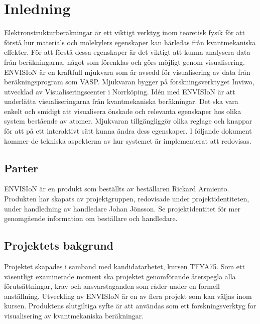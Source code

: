 \section{Inledning}
Elektronstrukturberäkningar är ett viktigt verktyg inom teoretisk fysik för att förstå hur materials och molekylers egenskaper kan härledas från kvantmekaniska effekter. För att förstå dessa egenskaper är det viktigt att kunna analysera data från beräkningarna, något som förenklas och görs möjligt genom visualisering. ENVISIoN är en kraftfull mjukvara som är avsedd för visualisering av data från beräkningsprogram som VASP. Mjukvaran bygger på forskningsverktyget Inviwo, utvecklad av Visualiseringscenter i Norrköping. Idén med ENVISIoN är att underlätta visualiseringarna från kvantmekaniska beräkningar. Det ska vara enkelt och smidigt att visualisera önskade och relevanta egenskaper hos olika system bestående av atomer. Mjukvaran tillgängliggör olika reglage och knappar för att på ett interaktivt sätt kunna ändra dess egenskaper. I följande dokument kommer de tekniska aspekterna av hur systemet är implementerat att redovisas.  

\subsection{Parter}
ENVISIoN är en produkt som beställts av beställaren Rickard Armiento. Produkten har skapats av projektgruppen, redovisade under projektidentiteten, under handledning av handledare Johan Jönsson. Se projektidentitet för mer genomgående information om beställare och handledare.    


\subsection{Projektets bakgrund} 
Projektet skapades i samband med kandidatarbetet, kursen TFYA75. Som ett väsentligt examinerade moment ska projektet genomförande återspegla alla förutsättningar, krav och ansvarstaganden som råder under en formell anställning. Utveckling av ENVISIoN är en av flera projekt som kan väljas inom kursen. Produktens slutgiltiga syfte är att användas som ett forskningsverktyg for visualisering av kvantmekaniska beräkningar.      


